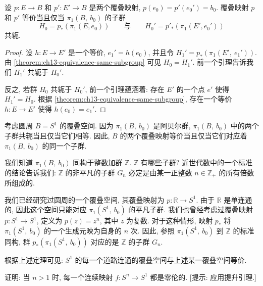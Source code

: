 \begin{theorem}[覆叠空间等价的共轭类判别]
\label{theorem:ch13-equivalence-conjugacy}
设 $p\colon E\to B$ 和 $p'\colon E'\to B$ 是两个覆叠映射, $p(e_{0})=p'(e_{0}')=b_{0}$. 覆叠映射 $p$ 和 $p'$ 等价当且仅当 $\pi_{1}(B,\ b_{0})$ 的子群
\[
H_{0}=p_{*}(\pi_{1}(E,e_{0}))\qquad\text{与}\qquad H_{0}'=p'_{*}(\pi_{1}(E',e_{0}'))
\]
共轭.
\end{theorem}

\begin{proof}
设 $h\colon E\to E'$ 是一个等价, $e_{1}'=h(e_{0})$, 并且令 $H_{1}'=p_{*}(\pi_{1}(E',\ e_{1}'))$. 由 \cref{theorem:ch13-equivalence-same-subgroup} 可见 $H_{0}=H_{1}'$. 前一个引理告诉我们 $H_{1}'$ 共轭于 $H_{0}'$.

反之, 若群 $H_{0}$ 共轭于 $H_{0}'$, 前一个引理蕴涵着: 存在 $E'$ 的一个点 $e'$ 使得 $H_{1}'=H_{0}$. 根据 \cref{theorem:ch13-equivalence-same-subgroup}, 存在一个等价 $h\colon E\to E'$ 使得 $h(e_{0})=e_{1}'$.
\end{proof}

\begin{example}[圆周的覆叠空间]
\label{example:ch13-circle-coverings}
考虑圆周 $B=S^{1}$ 的覆叠空间. 因为 $\pi_{1}(B,\ b_{0})$ 是阿贝尔群, $\pi_{1}(B,\ b_{0})$ 中的两个子群共轭当且仅当它们相等. 因此, $B$ 的两个覆叠映射等价当且仅当它们对应着 $\pi_{1}(B,\ b_{0})$ 的同一个子群.

我们知道 $\pi_{1}(B,\ b_{0})$ 同构于整数加群 $\mathbb{Z}$. $\mathbb{Z}$ 有哪些子群? 近世代数中的一个标准的结论告诉我们: $\mathbb{Z}$ 的非平凡的子群 $G_{n}$ 必定是由某一正整数 $n\in\mathbb{Z}_{+}$ 的所有倍数所组成的.

我们已经研究过圆周的一个覆叠空间, 其覆叠映射为 $p\colon\mathbb{R}\to S^{1}$. 由于 $\mathbb{R}$ 是单连通的, 因此这个空间只能对应 $\pi_{1}(S^{1},\ b_{0})$ 的平凡子群. 我们也曾经考虑过覆叠映射 $p\colon S^{1}\to S^{1}$, 定义为 $p(z)=z^{n}$, 其中 $z$ 为复数. 对于这种情形, 映射 $p_{*}$ 将 $\pi_{1}(S^{1},\ b_{0})$ 的一个生成元映为自身的 $n$ 次. 因此, 参照 $\pi_{1}(S^{1},\ b_{0})$ 到 $\mathbb{Z}$ 的标准同构, 群 $p_{*}(\pi_{1}(S^{1},\ b_{0}))$ 对应的是 $\mathbb{Z}$ 的子群 $G_{n}$.

根据上述定理可见: $S^{1}$ 的每一个道路连通的覆叠空间与上述某一覆叠空间等价.
\end{example}

\begin{exercise}
\label{exercise:ch13-sec79-01}
证明: 当 $n>1$ 时, 每一个连续映射 $f\colon S^{n}\to S^{1}$ 都是零伦的. [提示: 应用提升引理.]
\end{exercise}


